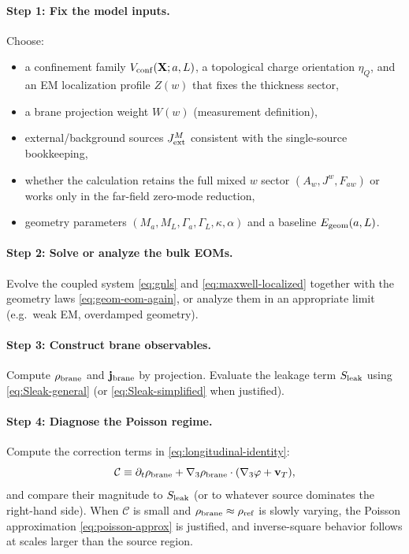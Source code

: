 \documentclass[11pt]{article}
\newcommand{\etaQ}{\eta_Q}
\newcommand{\rhoref}{\rho_{\rm ref}}
\begin{document}
\paragraph{Step 1: Fix the model inputs.}
Choose:
\begin{itemize}[leftmargin=2.0em]
\item a confinement family $V_{\rm conf}(\mathbf{X};a,L)$, a topological charge orientation $\etaQ$, and an EM localization profile $Z(w)$ that fixes the thickness sector,
\item a brane projection weight $W(w)$ (measurement definition),
\item external/background sources $J_{\rm ext}^M$ consistent with the single-source bookkeeping,
\item whether the calculation retains the full mixed $w$ sector $(A_w,J^w,F_{a w})$ or works only in the far-field zero-mode reduction,
\item geometry parameters $(M_a,M_L,\Gamma_a,\Gamma_L,\kappa,\alpha)$ and a baseline $E_{\rm geom}(a,L)$.
\end{itemize}

\paragraph{Step 2: Solve or analyze the bulk EOMs.}
Evolve the coupled system \eqref{eq:gnls} and \eqref{eq:maxwell-localized} together with the geometry laws \eqref{eq:geom-eom-again}, or analyze them in an appropriate limit (e.g.\ weak EM, overdamped geometry).

\paragraph{Step 3: Construct brane observables.}
Compute $\rho_{\rm brane}$ and $\mathbf{j}_{\rm brane}$ by projection. Evaluate the leakage term $S_{\rm leak}$ using \eqref{eq:Sleak-general} (or \eqref{eq:Sleak-simplified} when justified).

\paragraph{Step 4: Diagnose the Poisson regime.}
Compute the correction terms in \eqref{eq:longitudinal-identity}:
\begin{equation}
\mathcal{C} \equiv
\partial_t\rho_{\rm brane}
+
\nabla_3\rho_{\rm brane}\cdot(\nabla_3\varphi+\mathbf{v}_T),
\end{equation}
and compare their magnitude to $S_{\rm leak}$ (or to whatever source dominates the right-hand side). When $\mathcal{C}$ is small and $\rho_{\rm brane}\approx\rhoref$ is slowly varying, the Poisson approximation \eqref{eq:poisson-approx} is justified, and inverse-square behavior follows at scales larger than the source region.
\end{document}
